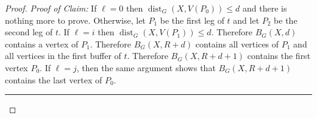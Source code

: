 \documentclass{patmorin}
\newenvironment{clmproof}{\noindent\emph{Proof of Claim:}}{\hfill\rule{1ex}{1ex}\newline}
\DeclareMathOperator{\dist}{dist}
\begin{document}
\begin{proof}
\begin{clmproof}
  If $\ell=0$ then $\dist_G(X,V(P_0))\le d$ and there is nothing more to prove.
  Otherwise, let $P_1$ be the first leg of $t$ and let $P_2$ be the second leg of $t$.  
  If $\ell=i$ then $\dist_G(X,V(P_1))\le d$.  Therefore $B_G(X,d)$ contains a vertex of $P_1$.  Therefore $B_G(X,R+d)$ contains all vertices of $P_1$ and all vertices in the first buffer of $t$.  Therefore $B_G(X,R+d+1)$ contains the first vertex $P_0$.
  If $\ell=j$, then the same argument shows that $B_G(X,R+d+1)$ contains the last vertex of $P_0$.
\end{clmproof}

\begin{clm}
  
\end{clm}


















\end{proof}
\end{document}
